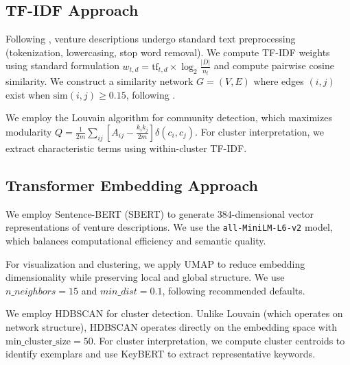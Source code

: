 \documentclass[../main.tex]{subfiles}
\begin{document}
\subsection{TF-IDF Approach}

Following \cite{basole2019visual}, venture descriptions undergo standard text preprocessing (tokenization, lowercasing, stop word removal). We compute TF-IDF weights using standard formulation $w_{t,d} = \text{tf}_{t,d} \times \log_2 \frac{|D|}{n_t}$ and compute pairwise cosine similarity. We construct a similarity network $G = (V, E)$ where edges $(i, j)$ exist when $\text{sim}(i, j) \geq 0.15$, following \cite{basole2019visual}.

We employ the Louvain algorithm \cite{blondel2008fast} for community detection, which maximizes modularity $Q = \frac{1}{2m} \sum_{ij} \left[ A_{ij} - \frac{k_i k_j}{2m} \right] \delta(c_i, c_j)$. For cluster interpretation, we extract characteristic terms using within-cluster TF-IDF.

\subsection{Transformer Embedding Approach}

We employ Sentence-BERT (SBERT) \cite{reimers2019sentence} to generate 384-dimensional vector representations of venture descriptions. We use the \texttt{all-MiniLM-L6-v2} model, which balances computational efficiency and semantic quality.

For visualization and clustering, we apply UMAP \cite{mcinnes2018umap} to reduce embedding dimensionality while preserving local and global structure. We use $n\_neighbors = 15$ and $min\_dist = 0.1$, following recommended defaults.

We employ HDBSCAN \cite{campello2013hdbscan} for cluster detection. Unlike Louvain (which operates on network structure), HDBSCAN operates directly on the embedding space with $\text{min\_cluster\_size} = 50$. For cluster interpretation, we compute cluster centroids to identify exemplars and use KeyBERT \cite{grootendorst2020keybert} to extract representative keywords.
\end{document}
